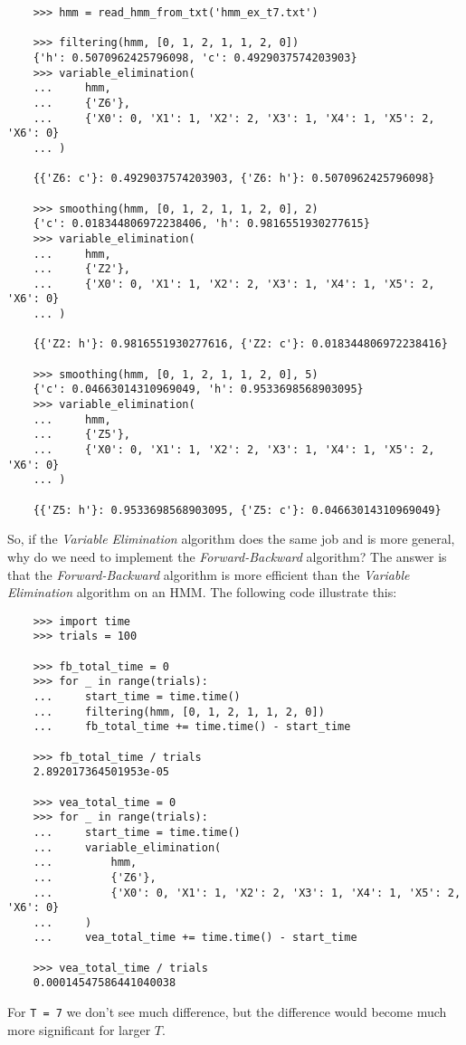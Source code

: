 \documentclass{article}
\theoremstyle{definition}
\begin{document}
\begin{verbatim}
    >>> hmm = read_hmm_from_txt('hmm_ex_t7.txt')

    >>> filtering(hmm, [0, 1, 2, 1, 1, 2, 0])
    {'h': 0.5070962425796098, 'c': 0.4929037574203903}
    >>> variable_elimination(
    ...     hmm,
    ...     {'Z6'},
    ...     {'X0': 0, 'X1': 1, 'X2': 2, 'X3': 1, 'X4': 1, 'X5': 2, 'X6': 0}
    ... )

    {{'Z6: c'}: 0.4929037574203903, {'Z6: h'}: 0.5070962425796098}

    >>> smoothing(hmm, [0, 1, 2, 1, 1, 2, 0], 2)
    {'c': 0.018344806972238406, 'h': 0.9816551930277615}
    >>> variable_elimination(
    ...     hmm,
    ...     {'Z2'},
    ...     {'X0': 0, 'X1': 1, 'X2': 2, 'X3': 1, 'X4': 1, 'X5': 2, 'X6': 0}
    ... )

    {{'Z2: h'}: 0.9816551930277616, {'Z2: c'}: 0.018344806972238416}

    >>> smoothing(hmm, [0, 1, 2, 1, 1, 2, 0], 5)
    {'c': 0.04663014310969049, 'h': 0.9533698568903095}
    >>> variable_elimination(
    ...     hmm,
    ...     {'Z5'},
    ...     {'X0': 0, 'X1': 1, 'X2': 2, 'X3': 1, 'X4': 1, 'X5': 2, 'X6': 0}
    ... )

    {{'Z5: h'}: 0.9533698568903095, {'Z5: c'}: 0.04663014310969049}
\end{verbatim}

So, if the \textit{Variable Elimination} algorithm does the same job and is more general, why do we need to implement the \textit{Forward-Backward} algorithm? The answer is that the \textit{Forward-Backward} algorithm is more efficient than the \textit{Variable Elimination} algorithm on an HMM. The following code illustrate this:

\begin{verbatim}
    >>> import time
    >>> trials = 100

    >>> fb_total_time = 0
    >>> for _ in range(trials):
    ...     start_time = time.time()
    ...     filtering(hmm, [0, 1, 2, 1, 1, 2, 0])
    ...     fb_total_time += time.time() - start_time

    >>> fb_total_time / trials
    2.892017364501953e-05

    >>> vea_total_time = 0
    >>> for _ in range(trials):
    ...     start_time = time.time()
    ...     variable_elimination(
    ...         hmm,
    ...         {'Z6'},
    ...         {'X0': 0, 'X1': 1, 'X2': 2, 'X3': 1, 'X4': 1, 'X5': 2, 'X6': 0}
    ...     )
    ...     vea_total_time += time.time() - start_time

    >>> vea_total_time / trials
    0.00014547586441040038
\end{verbatim}

For \texttt{T = 7} we don't see much difference, but the difference would become much more significant for larger \(T\).
\end{document}
